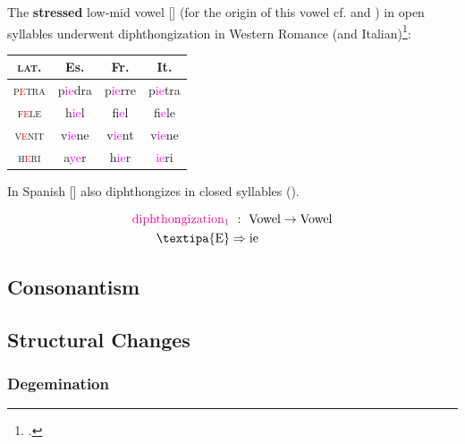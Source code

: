 \documentclass{report}[12pt]
\begin{document}
The \textbf{stressed} low-mid vowel [] (for the origin of this vowel cf.  and ) in open syllables underwent diphthongization in Western Romance (and Italian)\footcite[p.~15-16]{romance_his}:
\begin{center}
  \begin{tabular}{c c c c}
    \textsc{lat.} & Es. & Fr. & It. \\
    \hline
    \textsc{p\textcolor{red}{e}tra} & p\textcolor{magenta}{ie}dra & p\textcolor{magenta}{ie}rre & p\textcolor{magenta}{ie}tra \\
    \textsc{f\textcolor{red}{e}le} & h\textcolor{magenta}{ie}l & f\textcolor{magenta}{ie}l & f\textcolor{magenta}{ie}le \\
    \textsc{v\textcolor{red}{e}nit} & v\textcolor{magenta}{ie}ne & v\textcolor{magenta}{ie}nt & v\textcolor{magenta}{ie}ne \\
    \textsc{h\textcolor{red}{e}ri} & a\textcolor{magenta}{ye}r & h\textcolor{magenta}{ie}r & \textcolor{magenta}{ie}ri \\
  \end{tabular}
\end{center}
In Spanish [] also diphthongizes in closed syllables ().

\begin{tcolorbox}
  \begin{align*}
    \text{\textcolor{magenta}{diphthongization$_1$}} &\ :\ \text{Vowel} \rightarrow \text{Vowel} \\
    \text{\textipa{E}} & \Rightarrow \text{ie} \\
  \end{align*}
\end{tcolorbox}

\subsection{Consonantism}

\subsection{Structural Changes}

\subsubsection{Degemination}

\begin{tcolorbox}
  
\end{tcolorbox}
\end{document}
